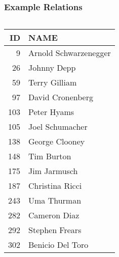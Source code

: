 \documentclass[dvipsnames]{beamer}
\theoremstyle{plain}
\begin{document}
\begin{frame}
  \frametitle{Example Relations}

  \begin{example}
    \begin{columns}[b]
      \begin{tiny}
      \begin{table}
        \begin{tabular}{|r|l|}\hline
 ID & NAME                 \\\hline\hline
  9 & Arnold Schwarzenegger\\\hline
 26 & Johnny Depp          \\\hline
 59 & Terry Gilliam        \\\hline
 97 & David Cronenberg     \\\hline
103 & Peter Hyams          \\\hline
105 & Joel Schumacher      \\\hline
138 & George Clooney       \\\hline
148 & Tim Burton           \\\hline
175 & Jim Jarmusch         \\\hline
187 & Christina Ricci      \\\hline
243 & Uma Thurman          \\\hline
282 & Cameron Diaz         \\\hline
292 & Stephen Frears       \\\hline
302 & Benicio Del Toro     \\\hline
        \end{tabular}
      \end{table}
      \end{tiny}


\end{columns}
\end{example}
\end{frame}
\end{document}
